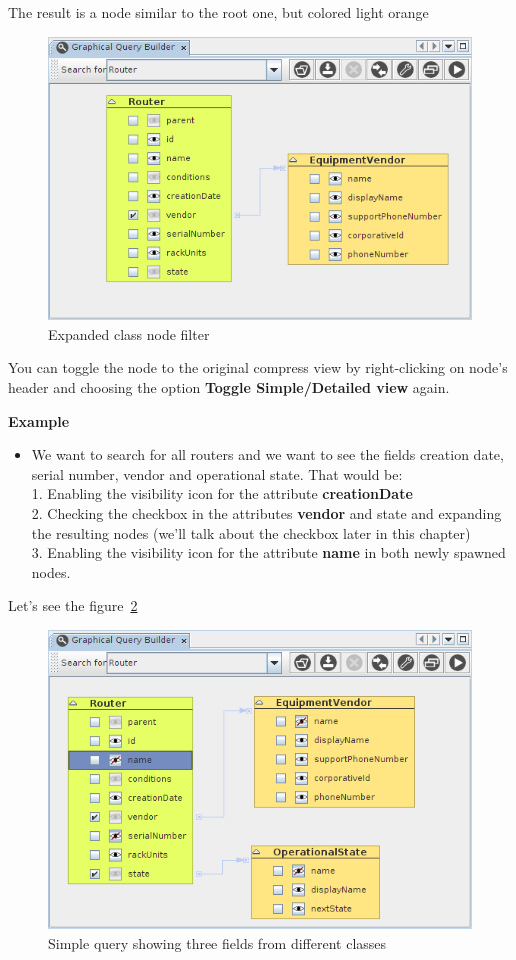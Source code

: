 \documentclass[a4paper]{article}
\begin{document}
	The result is a node similar to the root one, but colored light orange
	\begin{figure}[h!]
		\centering
		\includegraphics[width=0.8\linewidth]{img/query_detail_view.png}
		\caption{Expanded class node filter}
		\label{fig:query_detail_view}
	\end{figure}
	
	You can toggle the node to the original compress view by right-clicking on node's header and choosing the option \textbf{Toggle Simple/Detailed view} again.
	
	\begin{framed} {\large \textbf{Example}}
		\begin{itemize}
			\item We want to search for all routers and we want to see the fields creation date, serial number, vendor and operational state. That would be:
			\\1. Enabling the visibility icon for the attribute \textbf{creationDate}
			\\2. Checking the checkbox in the attributes  \textbf{vendor} and state and expanding the resulting nodes (we'll talk about the checkbox later in this chapter)
			\\3. Enabling the visibility icon for the attribute  \textbf{name} in both newly spawned nodes.
		\end{itemize}
	\end{framed}
	
	\newpage
	Let's see the figure~\ref{fig:query_multiple_nodes}
	\begin{figure}[h!]
		\centering
		\includegraphics[width=0.8\linewidth]{img/query_multiple_nodes.png}
		\caption{Simple query showing three fields from different classes}
		\label{fig:query_multiple_nodes}
	\end{figure}
	
\end{document}
